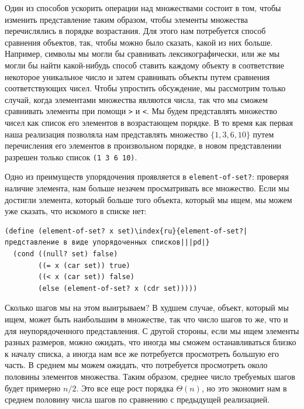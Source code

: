 Один из способов ускорить операции над множествами
состоит в том, чтобы изменить представление таким образом, чтобы
элементы множества перечислялись в порядке возрастания.  Для этого
нам потребуется способ сравнения объектов, так, чтобы
можно было сказать, какой из них больше.  Например, символы мы могли
бы сравнивать лексикографически, или же мы могли бы найти какой-нибудь 
способ ставить каждому объекту в соответствие некоторое уникальное
число и затем сравнивать объекты путем сравнения соответствующих
чисел.  Чтобы упростить обсуждение, мы рассмотрим только случай, когда 
элементами множества являются числа, так что мы сможем сравнивать
элементы при помощи {\tt >} и {\tt <}.  Мы будем 
представлять множество чисел как список его элементов в возрастающем
порядке.  В то время как первая наша реализация позволяла нам
представлять множество $\{1, 3, 6, 10\}$ путем перечисления 
его элементов в произвольном порядке, в новом представлении разрешен
только список {\tt (1 3 6 10)}.

Одно из преимуществ упорядочения проявляется в
{\tt element-of-set?}: проверяя наличие элемента, нам больше
незачем просматривать все множество.  Если мы достигли элемента,
который больше того объекта, который мы ищем, мы можем уже сказать,
что искомого в списке нет:

\begin{Verbatim}[fontsize=\small]
(define (element-of-set? x set)\index{ru}{element-of-set?|представление в виде упорядоченных списков|||pd|}
  (cond ((null? set) false)
        ((= x (car set)) true)
        ((< x (car set)) false)
        (else (element-of-set? x (cdr set)))))
\end{Verbatim}
Сколько шагов мы на этом выигрываем? В худшем случае, объект, который
мы ищем, может быть наибольшим в множестве, так что число шагов то же, 
что и для неупорядоченного представления.  С другой стороны, если мы
ищем элементы разных размеров, можно ожидать, что иногда мы сможем
останавливаться близко к началу списка, а иногда нам все же
потребуется просмотреть большую его часть.  В среднем мы можем
ожидать, что потребуется просмотреть около половины элементов
множества.  Таким образом, среднее число требуемых шагов будет
примерно $n / 2$. Это все еще рост порядка $\Theta 
(n)$, но это экономит нам в среднем половину числа шагов по 
сравнению с предыдущей реализацией.

